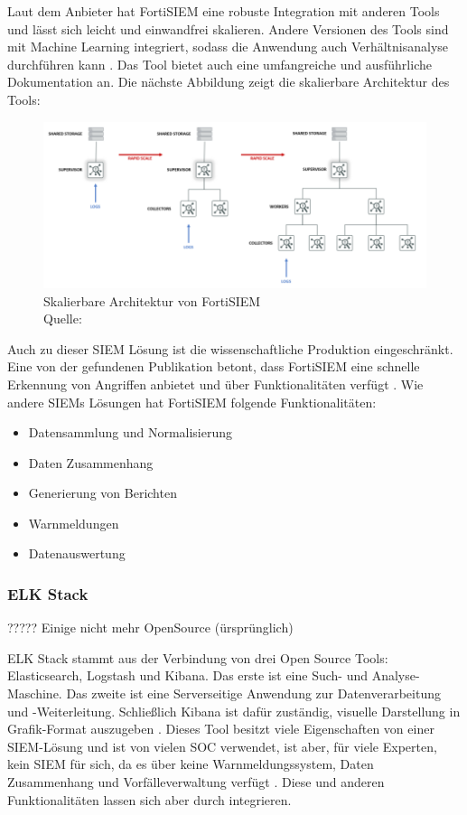 Laut dem Anbieter hat FortiSIEM eine robuste Integration mit anderen Tools und lässt sich leicht und einwandfrei skalieren. Andere Versionen des Tools sind mit Machine Learning integriert, sodass die Anwendung auch Verhältnisanalyse durchführen kann \citep{Fortinet_Solutions}. Das Tool bietet auch eine umfangreiche und ausführliche Dokumentation an. Die nächste Abbildung zeigt die skalierbare Architektur des Tools:

\begin{figure}[H]
   \centering
   \includegraphics[width=1\textwidth]{assets/2_p7.png}
   \caption{Skalierbare Architektur von FortiSIEM \\Quelle: \citep{Fortinet_Arch} }
   \centering
\end{figure}

Auch zu dieser \gls{SIEM} Lösung ist die wissenschaftliche Produktion eingeschränkt. Eine von der gefundenen Publikation betont, dass FortiSIEM eine schnelle Erkennung von Angriffen  anbietet und über  Funktionalitäten verfügt \citep{Ramires_fortisiem}. Wie andere \glspl{SIEM} Lösungen hat FortiSIEM folgende Funktionalitäten:

\begin{itemize}[noitemsep]
   \item Datensammlung und Normalisierung
   \item Daten Zusammenhang
   \item Generierung von Berichten
   \item Warnmeldungen
   \item Datenauswertung 
\end{itemize}

\subsubsection{ELK Stack}
????? Einige nicht mehr OpenSource (ürsprünglich)


ELK Stack stammt aus der Verbindung von drei \gls{Open Source} Tools: Elasticsearch, Logstash und Kibana. Das erste ist eine Such- und Analyse-Maschine. Das zweite ist eine Serverseitige Anwendung zur Datenverarbeitung und -Weiterleitung. Schließlich Kibana ist dafür zuständig, visuelle Darstellung in Grafik-Format auszugeben \citep{packt_elkstack}. Dieses Tool besitzt viele Eigenschaften von einer \gls{SIEM}-Lösung und ist von vielen \gls{SOC} verwendet, ist aber, für viele Experten, kein \gls{SIEM} für sich, da es über keine Warnmeldungssystem, Daten Zusammenhang und Vorfälleverwaltung verfügt \citep{Miller_ELK}. Diese und anderen Funktionalitäten lassen sich aber durch  integrieren. 


